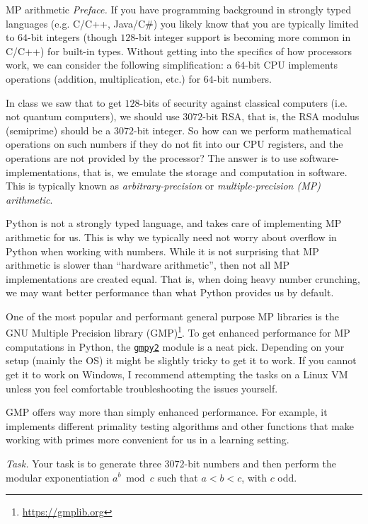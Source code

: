 \documentclass{practice}
\begin{document}
\begin{task}{MP arithmetic}
  \textit{Preface.}
  If you have programming background in strongly typed languages (e.g. C/C++, Java/C\#) you likely know that you are typically limited to $64$-bit integers (though $128$-bit integer support is becoming more common in C/C++) for built-in types.
  Without getting into the specifics of how processors work, we can consider the following simplification: a $64$-bit CPU implements operations (addition, multiplication, etc.) for $64$-bit numbers.

  In class we saw that to get $128$-bits of security against classical computers (i.e. not quantum computers), we should use $3072$-bit RSA, that is, the RSA modulus (semiprime) should be a $3072$-bit integer.
  So how can we perform mathematical operations on such numbers if they do not fit into our CPU registers, and the operations are not provided by the processor?
  The answer is to use software-implementations, that is, we emulate the storage and computation in software.
  This is typically known as \emph{arbitrary-precision} or \emph{multiple-precision (MP) arithmetic}.

  Python is not a strongly typed language, and takes care of implementing MP arithmetic for us.
  This is why we typically need not worry about overflow in Python when working with numbers.
  While it is not surprising that MP arithmetic is slower than \enquote{hardware arithmetic}, then not all MP implementations are created equal.
  That is, when doing heavy number crunching, we may want better performance than what Python provides us by default.

  One of the most popular and performant general purpose MP libraries is the GNU Multiple Precision library (GMP)\footnote{\url{https://gmplib.org}}.
  To get enhanced performance for MP computations in Python, the \href{https://pypi.org/project/gmpy2/}{\texttt{gmpy2}} module is a neat pick.
  Depending on your setup (mainly the OS) it might be slightly tricky to get it to work.
  If you cannot get it to work on Windows, I recommend attempting the tasks on a Linux VM unless you feel comfortable troubleshooting the issues yourself.

  GMP offers way more than simply enhanced performance.
  For example, it implements different primality testing algorithms and other functions that make working with primes more convenient for us in a learning setting.

  \textit{Task.}
  Your task is to generate three $3072$-bit numbers and then perform the modular exponentiation $a^b \bmod c$ such that $a < b < c$, with $c$ odd.


\end{task}
\end{document}
